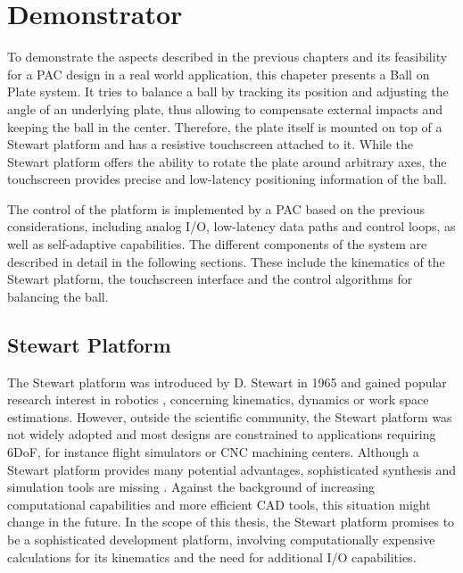 \chapter{Demonstrator}
\label{chap:demonstrator}

To demonstrate the aspects described in the previous chapters and its
feasibility for a \ac{PAC} design in a real world application, this chapeter
presents a Ball on Plate system. It tries to balance a ball by tracking its
position and adjusting the angle of an underlying plate, thus allowing to
compensate external impacts and keeping the ball in the center. Therefore, the
plate itself is mounted on top of a Stewart platform and has a resistive
touchscreen attached to it. While the Stewart platform offers the ability to
rotate the plate around arbitrary axes, the touchscreen provides precise and
low-latency positioning information of the ball.

The control of the platform is implemented by a \ac{PAC} based on the previous
considerations, including analog I/O, low-latency data paths and control
loops, as well as self-adaptive capabilities. The different components of the
system are described in detail in the following sections. These include the
kinematics of the Stewart platform, the touchscreen interface and the control
algorithms for balancing the ball.

\section{Stewart Platform}
The Stewart platform was introduced by D. Stewart in 1965 \citep{Ste65} and
gained popular research interest in robotics \citep{Szu13}, concerning
kinematics, dynamics or work space estimations. However, outside the
scientific community, the Stewart platform was not widely adopted and most
designs are constrained to applications requiring \ac{6DoF}, for instance
flight simulators or \ac{CNC} machining centers. Although a Stewart platform
provides many potential advantages, sophisticated synthesis and simulation
tools are missing \citep{Ji96}. Against the background of increasing
computational capabilities and more efficient \ac{CAD} tools, this situation
might change in the future. In the scope of this thesis, the Stewart platform
promises to be a sophisticated development platform, involving computationally
expensive calculations for its kinematics and the need for additional I/O
capabilities.


